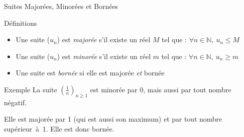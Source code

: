 \documentclass{coursbook}
\begin{document}
    \begin{Gpartie}{Suites Majorées, Minorées et Bornées} 
        \begin{Spartie}{Définitions} 
            \begin{itemize}
                \item Une suite ($u_n$) est \emph{majorée} s'il existe un réel $M$ tel que : $\forall n\in\mathbb{N},~u_n\leq M$
                \item Une suite ($u_n$) est \emph{minorée} s'il existe un réel $m$ tel que : $\forall n\in\mathbb{N},~u_n\geq m$
                \item Une suite est \emph{bornée} si elle est majorée \emph{et} bornée
            \end{itemize}
        \end{Spartie}
        \begin{Spartie}{Exemple} 
            La suite $\left(\frac{1}{n}\right)_{n\geq 1}$ est minorée par 0, mais aussi par tout nombre négatif. 
            
            Elle est majorée par 1 (qui est aussi son maximum) et par tout nombre supérieur~à~1. Elle est donc bornée.
        \end{Spartie}
    \end{Gpartie}
\end{document}
